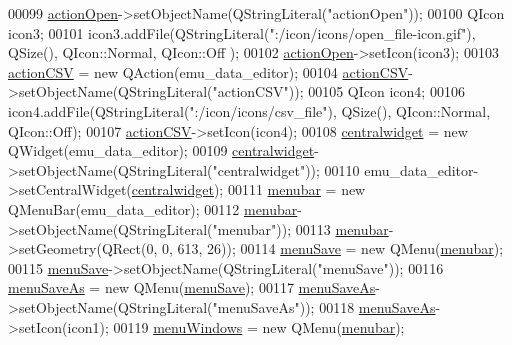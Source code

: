 \begin{DoxyCode}
00099         \hyperlink{a00079_a3ceb57268680eb23f6a3d522b303bb43}{actionOpen}->setObjectName(QStringLiteral(\textcolor{stringliteral}{"actionOpen"}));
00100         QIcon icon3;
00101         icon3.addFile(QStringLiteral(\textcolor{stringliteral}{":/icon/icons/open\_file-icon.gif"}), QSize(), QIcon::Normal, QIcon::Off
      );
00102         \hyperlink{a00079_a3ceb57268680eb23f6a3d522b303bb43}{actionOpen}->setIcon(icon3);
00103         \hyperlink{a00079_afae3d61aac77b6c20a7953b3adba9672}{actionCSV} = \textcolor{keyword}{new} QAction(emu\_data\_editor);
00104         \hyperlink{a00079_afae3d61aac77b6c20a7953b3adba9672}{actionCSV}->setObjectName(QStringLiteral(\textcolor{stringliteral}{"actionCSV"}));
00105         QIcon icon4;
00106         icon4.addFile(QStringLiteral(\textcolor{stringliteral}{":/icon/icons/csv\_file"}), QSize(), QIcon::Normal, QIcon::Off);
00107         \hyperlink{a00079_afae3d61aac77b6c20a7953b3adba9672}{actionCSV}->setIcon(icon4);
00108         \hyperlink{a00079_afff870ab422d2b873976067827089af1}{centralwidget} = \textcolor{keyword}{new} QWidget(emu\_data\_editor);
00109         \hyperlink{a00079_afff870ab422d2b873976067827089af1}{centralwidget}->setObjectName(QStringLiteral(\textcolor{stringliteral}{"centralwidget"}));
00110         emu\_data\_editor->setCentralWidget(\hyperlink{a00079_afff870ab422d2b873976067827089af1}{centralwidget});
00111         \hyperlink{a00079_af09fe2fe1f34525f5caeb5ada7d297bf}{menubar} = \textcolor{keyword}{new} QMenuBar(emu\_data\_editor);
00112         \hyperlink{a00079_af09fe2fe1f34525f5caeb5ada7d297bf}{menubar}->setObjectName(QStringLiteral(\textcolor{stringliteral}{"menubar"}));
00113         \hyperlink{a00079_af09fe2fe1f34525f5caeb5ada7d297bf}{menubar}->setGeometry(QRect(0, 0, 613, 26));
00114         \hyperlink{a00079_a36a184d4c55f5de1b542257cbe23adaf}{menuSave} = \textcolor{keyword}{new} QMenu(\hyperlink{a00079_af09fe2fe1f34525f5caeb5ada7d297bf}{menubar});
00115         \hyperlink{a00079_a36a184d4c55f5de1b542257cbe23adaf}{menuSave}->setObjectName(QStringLiteral(\textcolor{stringliteral}{"menuSave"}));
00116         \hyperlink{a00079_a2568794cbc6cc9907104efbfd79eba7d}{menuSaveAs} = \textcolor{keyword}{new} QMenu(\hyperlink{a00079_a36a184d4c55f5de1b542257cbe23adaf}{menuSave});
00117         \hyperlink{a00079_a2568794cbc6cc9907104efbfd79eba7d}{menuSaveAs}->setObjectName(QStringLiteral(\textcolor{stringliteral}{"menuSaveAs"}));
00118         \hyperlink{a00079_a2568794cbc6cc9907104efbfd79eba7d}{menuSaveAs}->setIcon(icon1);
00119         \hyperlink{a00079_a0c7cba2d30d21689f48f1981e976c0b6}{menuWindows} = \textcolor{keyword}{new} QMenu(\hyperlink{a00079_af09fe2fe1f34525f5caeb5ada7d297bf}{menubar});

\end{DoxyCode}
